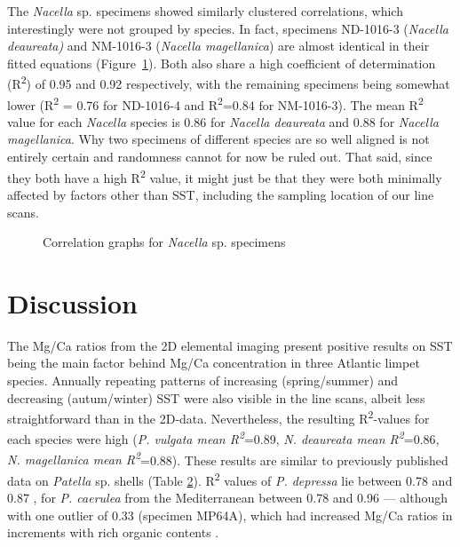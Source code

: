 \documentclass[
  authoryear,
  preprint,
  3p]{elsarticle}
\begin{document}
The \emph{Nacella} sp. specimens showed similarly clustered
correlations, which interestingly were not grouped by species. In fact,
specimens ND-1016-3 (\emph{Nacella deaureata)} and NM-1016-3
(\emph{Nacella magellanica}) are almost identical in their fitted
equations (Figure~\ref{fig-Nac_Corr}). Both also share a high
coefficient of determination (R\textsuperscript{2}) of 0.95 and 0.92
respectively, with the remaining specimens being somewhat lower
(R\textsuperscript{2} = 0.76 for ND-1016-4 and R\textsuperscript{2}=0.84
for NM-1016-3). The mean R\textsuperscript{2} value for each
\emph{Nacella} species is 0.86 for \emph{Nacella deaureata} and 0.88 for
\emph{Nacella magellanica}. Why two specimens of different species are
so well aligned is not entirely certain and randomness cannot for now be
ruled out. That said, since they both have a high R\textsuperscript{2}
value, it might just be that they were both minimally affected by
factors other than SST, including the sampling location of our line
scans.

\begin{figure}


\caption{\label{fig-Nac_Corr}Correlation graphs for \emph{Nacella} sp.
specimens}

\end{figure}%

\section{Discussion}\label{Discussion}

The Mg/Ca ratios from the 2D elemental imaging present positive results
on SST being the main factor behind Mg/Ca concentration in three
Atlantic limpet species. Annually repeating patterns of increasing
(spring/summer) and decreasing (autum/winter) SST were also visible in
the line scans, albeit less straightforward than in the 2D-data.
Nevertheless, the resulting R\textsuperscript{2}-values for each species
were high (\emph{P. vulgata mean R\textsuperscript{2}}=0.89, \emph{N.
deaureata mean R\textsuperscript{2}}=0.86\emph{, N. magellanica mean
R\textsuperscript{2}}=0.88). These results are similar to previously
published data on \emph{Patella} sp. shells (Table
\hyperref[Table_2]{2}). R\textsuperscript{2} values of \emph{P.
depressa} lie between 0.78 and 0.87 \citep{Garcia-Escarzaga2021-ij}, for
\emph{P. caerulea} from the Mediterranean between 0.78 and 0.96 ---
although with one outlier of 0.33 (specimen MP64A), which had increased
Mg/Ca ratios in increments with rich organic contents
\citep{Hausmann2019-fi}.
\end{document}
